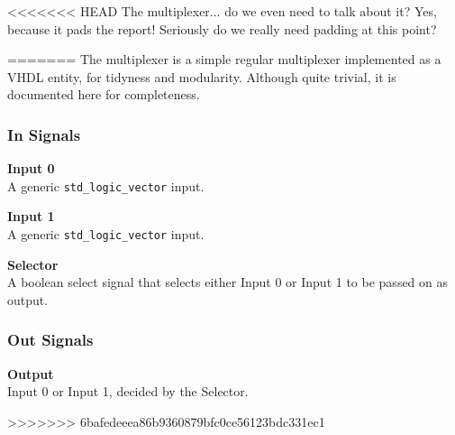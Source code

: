 <<<<<<< HEAD
The multiplexer... do we even need to talk about it? Yes, because it pads the report!
Seriously do we really need padding at this point?

=======
The multiplexer is a simple regular multiplexer implemented as a VHDL entity, for tidyness and modularity.
Although quite trivial, it is documented here for completeness.

\subsubsection{In Signals}

\begin{description}
\item{\textbf{Input 0}} \\

A generic \texttt{std\_logic\_vector} input.

\item{\textbf{Input 1}} \\

A generic \texttt{std\_logic\_vector} input.

\item{\textbf{Selector}} \\

A boolean select signal that selects either Input 0 or Input 1 to be passed on as output.

\end{description}

\subsubsection{Out Signals}

\begin{description}
\item{\textbf{Output}} \\

Input 0 or Input 1, decided by the Selector.

\end{description}
>>>>>>> 6bafedeeea86b9360879bfc0ce56123bdc331ec1
